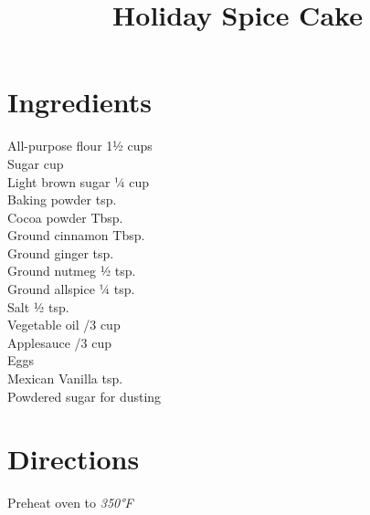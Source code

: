\documentclass[11pt,letterpaper]{article}
\title{Holiday Spice Cake}
\author{}
\date{}
\begin{document}
\maketitle
\thispagestyle{empty}

\section*{Ingredients}
\setlength{\columnsep}{20pt}
\begin{multicols}{2}
\noindent
    All-purpose flour \dotfill 1½ cups \\
    Sugar  cup \\
    Light brown sugar \dotfill ¼ cup \\
    Baking powder  tsp. \\
    Cocoa powder  Tbsp. \\
    Ground cinnamon  Tbsp. \\
    Ground ginger  tsp. \\
    Ground nutmeg \dotfill ½ tsp. \\
    \columnbreak
    Ground allspice \dotfill ¼ tsp. \\
    Salt \dotfill ½ tsp. \\
    Vegetable oil /3 cup \\
    Applesauce /3 cup \\
    Eggs  \\
    Mexican Vanilla  tsp. \\
    Powdered sugar \dotfill for dusting \\
\end{multicols}

\section*{Directions}

\noindent
Preheat oven to \textit{350°F}
\end{document}
